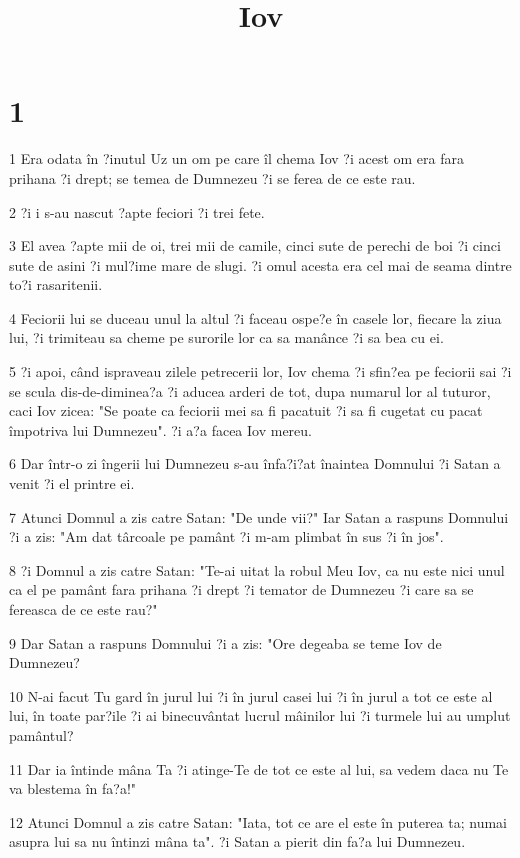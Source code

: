 

\title{Iov}


\chapter{1}

\par 1 Era odata în ?inutul Uz un om pe care îl chema Iov ?i acest om era fara prihana ?i drept; se temea de Dumnezeu ?i se ferea de ce este rau.
\par 2 ?i i s-au nascut ?apte feciori ?i trei fete.
\par 3 El avea ?apte mii de oi, trei mii de camile, cinci sute de perechi de boi ?i cinci sute de asini ?i mul?ime mare de slugi. ?i omul acesta era cel mai de seama dintre to?i rasaritenii.
\par 4 Feciorii lui se duceau unul la altul ?i faceau ospe?e în casele lor, fiecare la ziua lui, ?i trimiteau sa cheme pe surorile lor ca sa manânce ?i sa bea cu ei.
\par 5 ?i apoi, când ispraveau zilele petrecerii lor, Iov chema ?i sfin?ea pe feciorii sai ?i se scula dis-de-diminea?a ?i aducea arderi de tot, dupa numarul lor al tuturor, caci Iov zicea: "Se poate ca feciorii mei sa fi pacatuit ?i sa fi cugetat cu pacat împotriva lui Dumnezeu". ?i a?a facea Iov mereu.
\par 6 Dar într-o zi îngerii lui Dumnezeu s-au înfa?i?at înaintea Domnului ?i Satan a venit ?i el printre ei.
\par 7 Atunci Domnul a zis catre Satan: "De unde vii?" Iar Satan a raspuns Domnului ?i a zis: "Am dat târcoale pe pamânt ?i m-am plimbat în sus ?i în jos".
\par 8 ?i Domnul a zis catre Satan: "Te-ai uitat la robul Meu Iov, ca nu este nici unul ca el pe pamânt fara prihana ?i drept ?i temator de Dumnezeu ?i care sa se fereasca de ce este rau?"
\par 9 Dar Satan a raspuns Domnului ?i a zis: "Ore degeaba se teme Iov de Dumnezeu?
\par 10 N-ai facut Tu gard în jurul lui ?i în jurul casei lui ?i în jurul a tot ce este al lui, în toate par?ile ?i ai binecuvântat lucrul mâinilor lui ?i turmele lui au umplut pamântul?
\par 11 Dar ia întinde mâna Ta ?i atinge-Te de tot ce este al lui, sa vedem daca nu Te va blestema în fa?a!"
\par 12 Atunci Domnul a zis catre Satan: "Iata, tot ce are el este în puterea ta; numai asupra lui sa nu întinzi mâna ta". ?i Satan a pierit din fa?a lui Dumnezeu.
